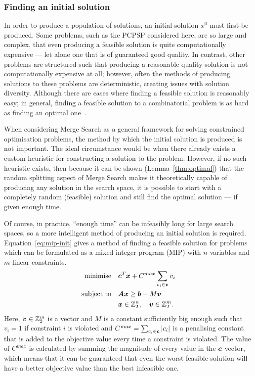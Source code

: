 \documentclass[journal]{IEEEtran}
\begin{document}
\subsubsection*{Finding an initial solution}
In order to produce a population of solutions, an initial solution $x^0$ must first be produced.
Some problems, such as the PCPSP considered here, are so large and complex, that even producing a feasible solution is quite computationally expensive --- let alone one that is of guaranteed good quality. In contrast, other problems are structured such that producing a reasonable quality solution is not computationally expensive at all; however, often the methods of producing solutions to these problems are deterministic, creating issues with solution diversity. Although there are cases where finding a feasible solution is reasonably easy; in general, finding a feasible solution to a combinatorial problem is as hard as finding an optimal one~\cite{Papadimitriou1982}.

When considering Merge Search as a general framework for solving constrained optimisation problems, the method by which the initial solution is produced is not important. The ideal circumstance would be when there already exists a custom heuristic for constructing a solution to the problem. However, if no such heuristic exists, then because it can be shown (Lemma~\ref{thm:optimal}) that the random splitting aspect of Merge Search makes it theoretically capable of producing any solution in the search space, it is possible to start with a completely random (feasible) solution and still find the optimal solution --- if given enough time.

Of course, in practice, ``enough time'' can be infeasibly long for large search spaces, so a more intelligent method of producing an initial solution is required. Equation~\ref{eq:mip-init} gives a method of finding a feasible solution for problems which can be formulated as a mixed integer program (MIP) with $n$ variables and $m$ linear constraints.
%
\begin{align}\label{eq:mip-init}
              \Min \quad &\V{c}^T\V{x} + C^{max} \sum_{v_i \in \V{v}} v_i\\
              \ST  \quad  &\M{A}\V{x} \ge \V{b}-M\V{v}\nonumber\\
                   \quad & \V{x} \in \Bin^n, \quad \V{v} \in \Bin^m.\nonumber
\end{align}
%
Here, $\boldsymbol{v} \in \mathbb{Z}_2^m$ is a vector and $M$ is a constant sufficiently big enough such that $v_i = 1$ if constraint $i$ is violated and $C^{max} = \sum_{c_i \in \boldsymbol{c}} |c_i|$ is a penalising constant that is added to the objective value every time a constraint is violated. The value of $C^{max}$ is calculated by summing the magnitude of every value in the $\boldsymbol{c}$ vector, which means that it can be guaranteed that even the worst feasible solution will have a better objective value than the best infeasible one.
\end{document}
